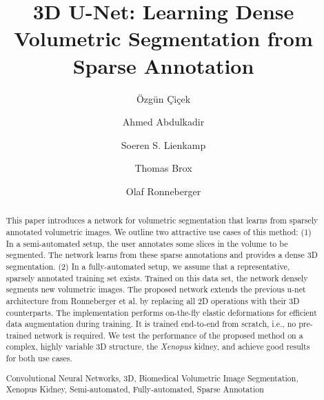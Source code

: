 \documentclass[runningheads,a4paper]{llncs}
\newcommand{\species}[1]{\textit{#1}}
\newcommand{\keywords}[1]{\par\addvspace\baselineskip
\noindent\keywordname\enspace\ignorespaces#1}
\begin{document}
\mainmatter


\title{3D U-Net: Learning Dense Volumetric Segmentation from Sparse Annotation}



\author{\"{O}zg\"{u}n \c{C}i\c{c}ek  
\and    Ahmed Abdulkadir  
\and    Soeren S. Lienkamp  
\and    Thomas Brox  
\and    Olaf Ronneberger } 



\maketitle

\setcounter{footnote}{0}

\begin{abstract}
This paper introduces a network for volumetric segmentation that learns from sparsely annotated volumetric images. We outline two attractive use cases of this method: (1) In a semi-automated setup, the user annotates some slices in the volume to be segmented. The network learns from these sparse annotations and provides a dense 3D segmentation. (2) In a fully-automated setup, we assume that a representative, sparsely annotated training set exists. Trained on this data set, the network densely segments new volumetric images. The proposed network extends the previous u-net architecture from Ronneberger et al. by replacing all 2D operations with their 3D counterparts. The implementation performs on-the-fly elastic deformations for efficient data augmentation during training. It is trained end-to-end from scratch, i.e., no pre-trained network is required. We test the performance of the proposed method on a complex, highly variable 3D structure, the \species{Xenopus} kidney, and achieve good results for both use cases. 


\keywords{Convolutional Neural Networks, 3D, Biomedical Volumetric Image Segmentation,
Xenopus Kidney, Semi-automated, Fully-automated, Sparse Annotation}
\end{abstract}
\end{document}
